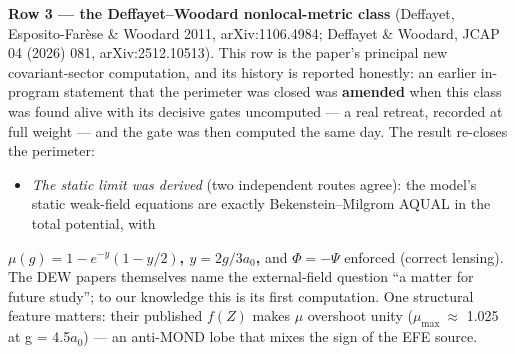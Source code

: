 \documentclass[11pt,a4paper]{article}
\begin{document}
\textbf{Row 3 --- the Deffayet--Woodard nonlocal-metric class} (Deffayet, Esposito-Far\`ese \& Woodard 2011, arXiv:1106.4984; Deffayet \& Woodard, JCAP 04 (2026) 081, arXiv:2512.10513). This row is the paper's principal new covariant-sector computation, and its history is reported honestly: an earlier in-program statement that the perimeter was closed was \textbf{amended} when this class was found alive with its decisive gates uncomputed --- a real retreat, recorded at full weight --- and the gate was then computed the same day. The result re-closes the perimeter:

\begin{itemize}
\item \emph{The static limit was derived} (two independent routes agree): the model's static weak-field equations are exactly Bekenstein--Milgrom AQUAL in the total potential, with

\end{itemize}

\textbf{$\mu(g) = 1 - e^{-y}(1 - y/2)$, $y = 2g/3a_0$,} and $\Phi = -\Psi$ enforced (correct lensing). The DEW papers themselves name the external-field question ``a matter for future study''; to our knowledge this is its first computation. One structural feature matters: their published $f(Z)$ makes $\mu$ overshoot unity ($\mu_{\mathrm{max}}\ \approx$ 1.025 at g = 4.5$a_{0}$) --- an anti-MOND lobe that mixes the sign of the EFE source.
\end{document}
